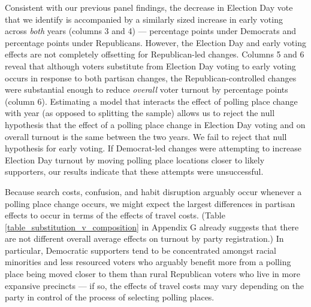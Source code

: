 \documentclass{cup_PSRM}
\begin{document}
Consistent with our previous panel findings, the decrease in Election Day vote that we identify is accompanied by a similarly sized increase in early voting across \emph{both} years (columns 3 and 4) ---  percentage points under Democrats and  percentage points under Republicans.  However, the Election Day and early voting effects are not completely offsetting for Republican-led changes.  Columns 5 and 6 reveal that although voters substitute from Election Day voting to early voting occurs in response to both partisan changes, the Republican-controlled changes were substantial enough to reduce \emph{overall} voter turnout by  percentage points (column 6).  Estimating a model that interacts the effect of polling place change with year (as opposed to splitting the sample) allows us to reject the null hypothesis that the effect of a polling place change in Election Day voting and on overall turnout is the same between the two years.  We fail to reject that null hypothesis for early voting.  If Democrat-led changes were attempting to increase Election Day turnout by moving polling place locations closer to likely supporters, our results indicate that these attempts were unsuccessful.  %

Because search costs, confusion, and habit disruption arguably occur whenever a polling place change occurs, we might expect the largest differences in partisan effects to occur in terms of the effects of travel costs. (Table \ref{table_substitution_v_composition} in Appendix G already suggests that there are not different overall average effects on turnout by party registration.)  In particular, Democratic supporters tend to be concentrated amongst racial minorities and less resourced voters who arguably benefit more from a polling place being moved closer to them than rural Republican voters who live in more expansive precincts --- if so, the effects of travel costs may vary depending on the party in control of the process of selecting polling places.
\end{document}
